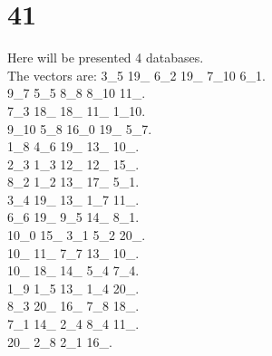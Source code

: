 \chapter{41}
\indent Here will be presented 4 databases.\\
The vectors are:
3\_5 19\_ 6\_2 19\_ 7\_10 6\_1.\\9\_7 5\_5 8\_8 8\_10 11\_.\\7\_3 18\_ 18\_ 11\_ 1\_10.\\9\_10 5\_8 16\_0 19\_ 5\_7.\\1\_8 4\_6 19\_ 13\_ 10\_.\\2\_3 1\_3 12\_ 12\_ 15\_.\\8\_2 1\_2 13\_ 17\_ 5\_1.\\3\_4 19\_ 13\_ 1\_7 11\_.\\6\_6 19\_ 9\_5 14\_ 8\_1.\\10\_0 15\_ 3\_1 5\_2 20\_.\\10\_ 11\_ 7\_7 13\_ 10\_.\\10\_ 18\_ 14\_ 5\_4 7\_4.\\1\_9 1\_5 13\_ 1\_4 20\_.\\8\_3 20\_ 16\_ 7\_8 18\_.\\7\_1 14\_ 2\_4 8\_4 11\_.\\20\_ 2\_8 2\_1 16\_.\\